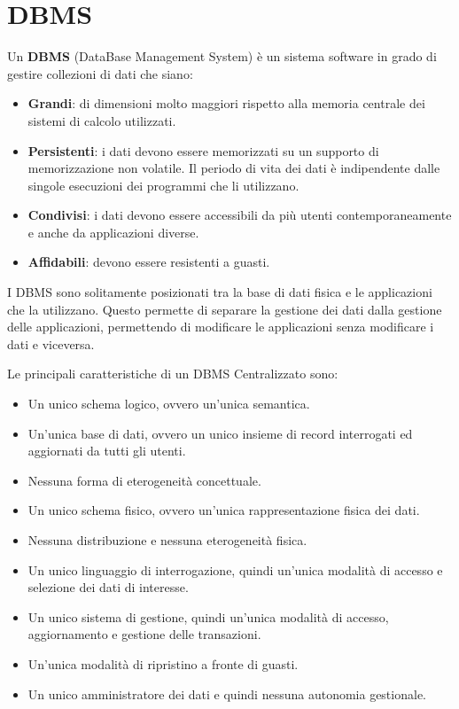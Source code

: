 \chapter{DBMS}
\begin{definizione}
      Un \textbf{DBMS} (DataBase Management System) è un sistema software in grado
      di gestire collezioni di dati che siano:
      \begin{itemize}
            \item \textbf{Grandi}: di dimensioni molto maggiori rispetto alla memoria
                  centrale dei sistemi di calcolo utilizzati.
            \item \textbf{Persistenti}: i dati devono essere memorizzati su un
                  supporto di memorizzazione non volatile. Il periodo di vita dei
                  dati è indipendente dalle singole esecuzioni dei programmi che li
                  utilizzano.
            \item \textbf{Condivisi}: i dati devono essere accessibili da più utenti
                  contemporaneamente e anche da applicazioni diverse.
            \item \textbf{Affidabili}: devono essere resistenti a guasti.
      \end{itemize}
\end{definizione}
I DBMS sono solitamente posizionati tra la base di dati fisica e le applicazioni
che la utilizzano. Questo permette di separare la gestione dei dati dalla
gestione delle applicazioni, permettendo di modificare le applicazioni senza
modificare i dati e viceversa.

Le principali caratteristiche di un DBMS Centralizzato sono:
\begin{itemize}
      \item Un unico schema logico, ovvero un'unica semantica.
      \item Un'unica base di dati, ovvero un unico insieme di record interrogati
            ed aggiornati da tutti gli utenti.
      \item Nessuna forma di eterogeneità concettuale.
      \item Un unico schema fisico, ovvero un'unica rappresentazione fisica dei
            dati.
      \item Nessuna distribuzione e nessuna eterogeneità fisica.
      \item Un unico linguaggio di interrogazione, quindi un'unica modalità di
            accesso e selezione dei dati di interesse.
      \item Un unico sistema di gestione, quindi un'unica modalità di accesso,
            aggiornamento e gestione delle transazioni.
      \item Un'unica modalità di ripristino a fronte di guasti.
      \item Un unico amministratore dei dati e quindi nessuna autonomia gestionale.
\end{itemize}

